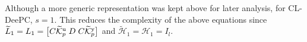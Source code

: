 Although a more generic representation was kept above for later analysis, for \ac{CL-DeePC}, $s=1$. This reduces the complexity of the above equations since ${\widetilde{L}_1=L_1=\big[ C\widetilde{\mathcal{K}}_{p}^{\mathrm{{u}}} \; D \; C\widetilde{\mathcal{K}}_{p}^{\mathrm{{y}}} \big]}$ and $\widetilde{\mathcal{H}}_1=\mathcal{H}_1=I_l$.
%

